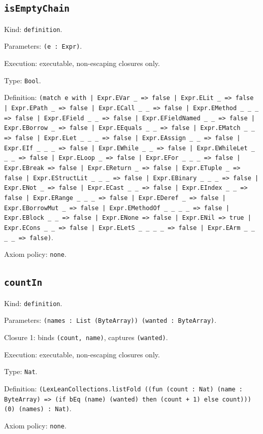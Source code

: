 \documentclass[11pt]{article}
\begin{document}
\subsection*{\texttt{isEmptyChain}}
\noindent Kind: \texttt{definition}.\par
\noindent Parameters: \texttt{(e : Expr)}.\par
\noindent Execution: executable, non-escaping closures only.\par
\noindent Type: \texttt{Bool}.\par
\noindent Definition: \texttt{(match e with | Expr.EVar \_ => false | Expr.ELit \_ => false | Expr.EPath \_ => false | Expr.ECall \_ \_ => false | Expr.EMethod \_ \_ \_ => false | Expr.EField \_ \_ => false | Expr.EFieldNamed \_ \_ => false | Expr.EBorrow \_ => false | Expr.EEquals \_ \_ => false | Expr.EMatch \_ \_ => false | Expr.ELet \_ \_ \_ => false | Expr.EAssign \_ \_ => false | Expr.EIf \_ \_ \_ => false | Expr.EWhile \_ \_ => false | Expr.EWhileLet \_ \_ \_ => false | Expr.ELoop \_ => false | Expr.EFor \_ \_ \_ => false | Expr.EBreak => false | Expr.EReturn \_ => false | Expr.ETuple \_ => false | Expr.EStructLit \_ \_ \_ => false | Expr.EBinary \_ \_ \_ => false | Expr.ENot \_ => false | Expr.ECast \_ \_ => false | Expr.EIndex \_ \_ => false | Expr.ERange \_ \_ \_ => false | Expr.EDeref \_ => false | Expr.EBorrowMut \_ => false | Expr.EMethodOf \_ \_ \_ \_ => false | Expr.EBlock \_ \_ => false | Expr.ENone => false | Expr.ENil => true | Expr.ECons \_ \_ => false | Expr.ELetS \_ \_ \_ \_ => false | Expr.EArm \_ \_ \_ \_ => false)}.\par
\noindent Axiom policy: \texttt{none}.\par
\subsection*{\texttt{countIn}}
\noindent Kind: \texttt{definition}.\par
\noindent Parameters: \texttt{(names : List (ByteArray)) (wanted : ByteArray)}.\par
\noindent Closure 1: binds \texttt{(count, name)}, captures \texttt{(wanted)}.\par
\noindent Execution: executable, non-escaping closures only.\par
\noindent Type: \texttt{Nat}.\par
\noindent Definition: \texttt{(LexLeanCollections.listFold ((fun (count : Nat) (name : ByteArray) => (if bEq (name) (wanted) then (count + 1) else count))) (0) (names) : Nat)}.\par
\noindent Axiom policy: \texttt{none}.\par
\end{document}
